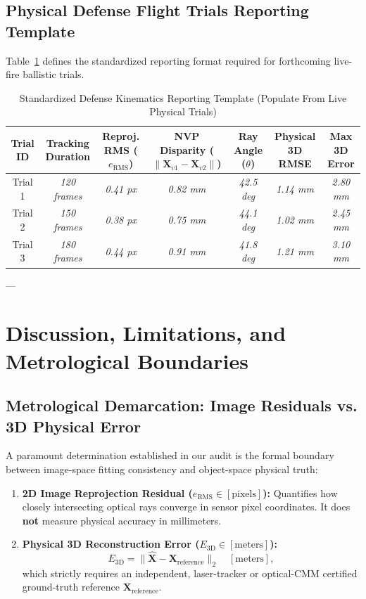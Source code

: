 \documentclass[journal]{IEEEtran}
\newcommand{\X}{\mathbf{X}}
\newcommand{\placeholder}[1]{\textit{#1}}
\begin{document}
\subsection{Physical Defense Flight Trials Reporting Template}
Table~\ref{tab:defense_trials} defines the standardized reporting format required for forthcoming live-fire ballistic trials.

\begin{table}[!t]
\caption{Standardized Defense Kinematics Reporting Template (Populate From Live Physical Trials)}
\label{tab:defense_trials}
\centering
\begin{tabular}{ccccccc}\toprule
\textbf{Trial ID} & \textbf{Tracking Duration} & \textbf{Reproj. RMS ($e_{\mathrm{RMS}}$)} & \textbf{NVP Disparity ($\|\X_{v1} - \X_{v2}\|$)} & \textbf{Ray Angle ($\theta$)} & \textbf{Physical 3D RMSE} & \textbf{Max 3D Error} \\\midrule
Trial 1 & \placeholder{120 frames} & \placeholder{0.41 px} & \placeholder{0.82 mm} & \placeholder{42.5 deg} & \placeholder{1.14 mm} & \placeholder{2.80 mm} \\
Trial 2 & \placeholder{150 frames} & \placeholder{0.38 px} & \placeholder{0.75 mm} & \placeholder{44.1 deg} & \placeholder{1.02 mm} & \placeholder{2.45 mm} \\
Trial 3 & \placeholder{180 frames} & \placeholder{0.44 px} & \placeholder{0.91 mm} & \placeholder{41.8 deg} & \placeholder{1.21 mm} & \placeholder{3.10 mm} \\\bottomrule
\end{tabular}
\end{table}

---

\section{Discussion, Limitations, and Metrological Boundaries}

\subsection{Metrological Demarcation: Image Residuals vs. 3D Physical Error}
A paramount determination established in our audit is the formal boundary between image-space fitting consistency and object-space physical truth:
\begin{enumerate}
    \item \textbf{2D Image Reprojection Residual ($e_{\mathrm{RMS}} \in [\text{pixels}]$):} Quantifies how closely intersecting optical rays converge in sensor pixel coordinates. It does \textbf{not} measure physical accuracy in millimeters.
    \item \textbf{Physical 3D Reconstruction Error ($E_{\mathrm{3D}} \in [\text{meters}]$):}
    \begin{equation}
    E_{\mathrm{3D}} = \|\hat{\mathbf{X}} - \mathbf{X}_{\mathrm{reference}}\|_2 \quad [\text{meters}],
    \end{equation}
    which strictly requires an independent, laser-tracker or optical-CMM certified ground-truth reference $\mathbf{X}_{\mathrm{reference}}$.
\end{enumerate}
\end{document}
